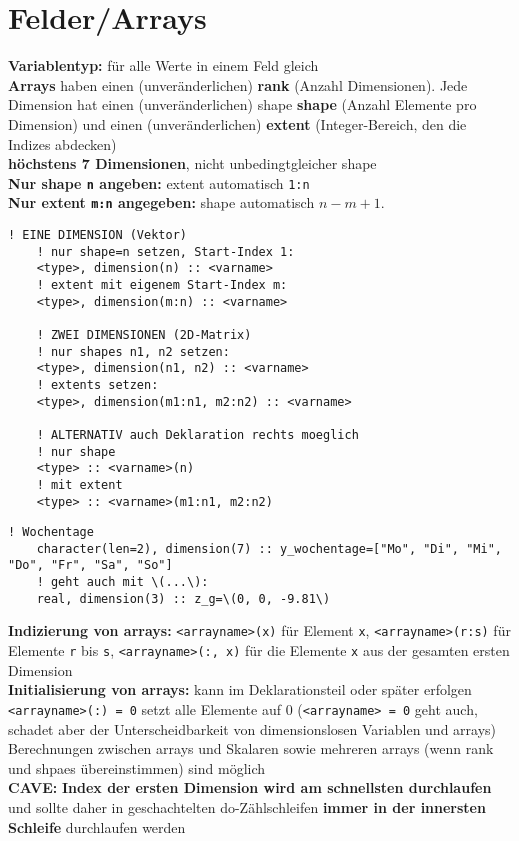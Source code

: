 \documentclass[a4paper, twocolumn]{scrarticle}
\begin{document}
  \section{Felder/Arrays}
  \textbf{Variablentyp:} für alle Werte in einem Feld  gleich\\
  \textbf{Arrays} haben einen (unveränderlichen) \textbf{rank} (Anzahl Dimensionen). Jede Dimension hat einen (unveränderlichen) shape \textbf{shape} (Anzahl Elemente pro Dimension) und einen (unveränderlichen) \textbf{extent} (Integer-Bereich, den die Indizes abdecken)\\
  \textbf{höchstens 7 Dimensionen}, nicht unbedingtgleicher shape\\
  \textbf{Nur shape \lstinline|n| angeben:} extent automatisch \lstinline|1:n|\\
  \textbf{Nur extent \lstinline|m:n| angegeben:} shape automatisch $n-m+1$.
  \begin{lstlisting}[caption={\bfseries Deklarationsmöglichkeiten für arrays}]
    ! EINE DIMENSION (Vektor)
    ! nur shape=n setzen, Start-Index 1:
    <type>, dimension(n) :: <varname>
    ! extent mit eigenem Start-Index m:
    <type>, dimension(m:n) :: <varname>
    
    ! ZWEI DIMENSIONEN (2D-Matrix)
    ! nur shapes n1, n2 setzen:
    <type>, dimension(n1, n2) :: <varname>
    ! extents setzen:
    <type>, dimension(m1:n1, m2:n2) :: <varname>
    
    ! ALTERNATIV auch Deklaration rechts moeglich
    ! nur shape
    <type> :: <varname>(n)
    ! mit extent
    <type> :: <varname>(m1:n1, m2:n2)
  \end{lstlisting}
  \begin{lstlisting}[caption={\bfseries Beispiele direkte Definition arrays}]
    ! Wochentage
    character(len=2), dimension(7) :: y_wochentage=["Mo", "Di", "Mi", "Do", "Fr", "Sa", "So"]
    ! geht auch mit \(...\):
    real, dimension(3) :: z_g=\(0, 0, -9.81\)
  \end{lstlisting}
  \textbf{Indizierung von arrays:} \lstinline|<arrayname>(x)| für Element \lstinline|x|, \lstinline|<arrayname>(r:s)| für Elemente \lstinline|r| bis \lstinline|s|, \lstinline|<arrayname>(:, x)| für die Elemente \lstinline|x| aus der gesamten ersten Dimension\\
  \textbf{Initialisierung von arrays:} kann im Deklarationsteil oder später erfolgen \lstinline|<arrayname>(:) = 0| setzt alle Elemente auf 0 (\lstinline|<arrayname> = 0| geht auch, schadet aber der Unterscheidbarkeit von dimensionslosen Variablen und arrays)\\
  Berechnungen zwischen arrays und Skalaren sowie mehreren arrays (wenn rank und shpaes übereinstimmen) sind möglich\\
  \textbf{CAVE:} \textbf{Index der ersten Dimension wird am schnellsten durchlaufen} und sollte daher in geschachtelten do-Zählschleifen \textbf{immer in der innersten Schleife} durchlaufen werden
 
\end{document}
